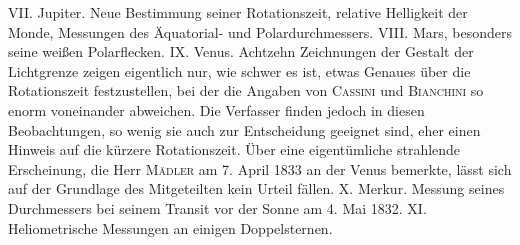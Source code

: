 VII. Jupiter. Neue Bestimmung seiner Rotationszeit, relative Helligkeit der Monde, Messungen des Äquatorial- und Polardurchmessers.
VIII. Mars, besonders seine weißen Polarflecken.
IX. Venus. Achtzehn Zeichnungen der Gestalt der Lichtgrenze zeigen eigentlich nur, wie schwer es ist, etwas Genaues über die Rotationszeit festzustellen, bei der die Angaben von \textsc{Cassini} und \textsc{Bianchini} so enorm voneinander abweichen. Die Verfasser finden jedoch in diesen Beobachtungen, so wenig sie auch zur Entscheidung geeignet sind, eher einen Hinweis auf die kürzere Rotationszeit. Über eine eigentümliche strahlende Erscheinung, die Herr \textsc{Mädler} am 7. April 1833 an der Venus bemerkte, lässt sich auf der Grundlage des Mitgeteilten kein Urteil fällen.
X. Merkur. Messung seines Durchmessers bei seinem Transit vor der Sonne am 4. Mai 1832.
XI. Heliometrische Messungen an einigen Doppelsternen.
